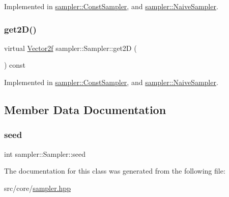 Implemented in \mbox{\hyperlink{classsampler_1_1ConstSampler_a5c8a7744e2b2f4170663cb9b9207179d}{sampler\+::\+Const\+Sampler}}, and \mbox{\hyperlink{classsampler_1_1NaiveSampler_ad1d445bae1088385deaa5ec05ce7e46a}{sampler\+::\+Naive\+Sampler}}.

\mbox{\label{classsampler_1_1Sampler_ad326337d2bac30ca6f95d01833d6e932}} 
\subsubsection{\texorpdfstring{get2D()}{get2D()}}
{\footnotesize\ttfamily virtual \mbox{\hyperlink{cyclop_8hpp_a0c5eff6545fe0b71d0592c88d930b697}{Vector2f}} sampler\+::\+Sampler\+::get2D (\begin{DoxyParamCaption}{ }\end{DoxyParamCaption}) const\hspace{0.3cm}{\ttfamily [pure virtual]}}



Implemented in \mbox{\hyperlink{classsampler_1_1ConstSampler_a21897522074763d7a61cbe374ae30dce}{sampler\+::\+Const\+Sampler}}, and \mbox{\hyperlink{classsampler_1_1NaiveSampler_a77655f0c205ae4680e58744850746f06}{sampler\+::\+Naive\+Sampler}}.



\subsection{Member Data Documentation}
\mbox{\label{classsampler_1_1Sampler_a47b39c5af16956df6781d37dbb602465}} 
\subsubsection{\texorpdfstring{seed}{seed}}
{\footnotesize\ttfamily int sampler\+::\+Sampler\+::seed}



The documentation for this class was generated from the following file\+:\begin{DoxyCompactItemize}
\item 
src/core/\mbox{\hyperlink{sampler_8hpp}{sampler.\+hpp}}\end{DoxyCompactItemize}
